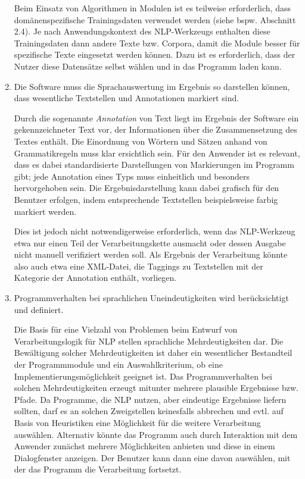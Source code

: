 \documentclass[12pt]{report}
\begin{document}
\begin{enumerate}
Beim Einsatz von Algorithmen in Modulen ist es teilweise erforderlich, dass domänenspezifische Trainingsdaten verwendet werden (siehe bspw. Abschnitt 2.4). Je nach Anwendungskontext des NLP-Werkzeugs enthalten diese Trainingsdaten dann andere Texte bzw. Corpora, damit die Module besser für spezifische Texte eingesetzt werden können. Dazu ist es erforderlich, dass der Nutzer diese Datensätze selbst wählen und in das Programm laden kann.

\item Die Software muss die Sprachauswertung im Ergebnis so darstellen können, dass wesentliche Textstellen und Annotationen markiert sind. 

Durch die sogenannte \textit{Annotation} von Text liegt im Ergebnis der Software ein gekennzeichneter Text vor, der Informationen über die Zusammensetzung des Textes enthält. Die Einordnung von Wörtern und Sätzen anhand von Grammatikregeln muss klar ersichtlich sein. Für den Anwender ist es relevant, dass es dabei standardisierte Darstellungen von Markierungen im Programm gibt; jede Annotation eines Typs muss einheitlich und besonders hervorgehoben sein. Die Ergebnisdarstellung kann dabei grafisch für den Benutzer erfolgen, indem entsprechende Textstellen beispielsweise farbig markiert werden.

Dies ist jedoch nicht notwendigerweise erforderlich, wenn das NLP-Werkzeug etwa nur einen Teil der Verarbeitungskette ausmacht oder dessen Ausgabe nicht manuell verifiziert werden soll. Als Ergebnis der Verarbeitung könnte also auch etwa eine XML-Datei, die Taggings zu Textstellen mit der Kategorie der Annotation enthält, vorliegen.

\item Programmverhalten bei sprachlichen Uneindeutigkeiten wird berücksichtigt und definiert.

Die Basis für eine Vielzahl von Problemen beim Entwurf von Verarbeitungslogik für NLP stellen sprachliche Mehrdeutigkeiten dar. Die Bewältigung solcher Mehrdeutigkeiten ist daher ein wesentlicher Bestandteil der Programmmodule und ein Auswahlkriterium, ob eine Implementierungsmöglichkeit geeignet ist. Das Programmverhalten bei solchen Mehrdeutigkeiten erzeugt mitunter mehrere plausible Ergebnisse bzw. Pfade. Da Programme, die NLP nutzen, aber eindeutige Ergebnisse liefern sollten, darf es an solchen Zweigstellen keinesfalls abbrechen und evtl. auf Basis von Heuristiken eine Möglichkeit für die weitere Verarbeitung auswählen. Alternativ könnte das Programm auch durch Interaktion mit dem Anwender zunächst mehrere Möglichkeiten anbieten und diese in einem Dialogfenster anzeigen. Der Benutzer kann dann eine davon auswählen, mit der das Programm die Verarbeitung fortsetzt.


\end{enumerate}
\end{document}
